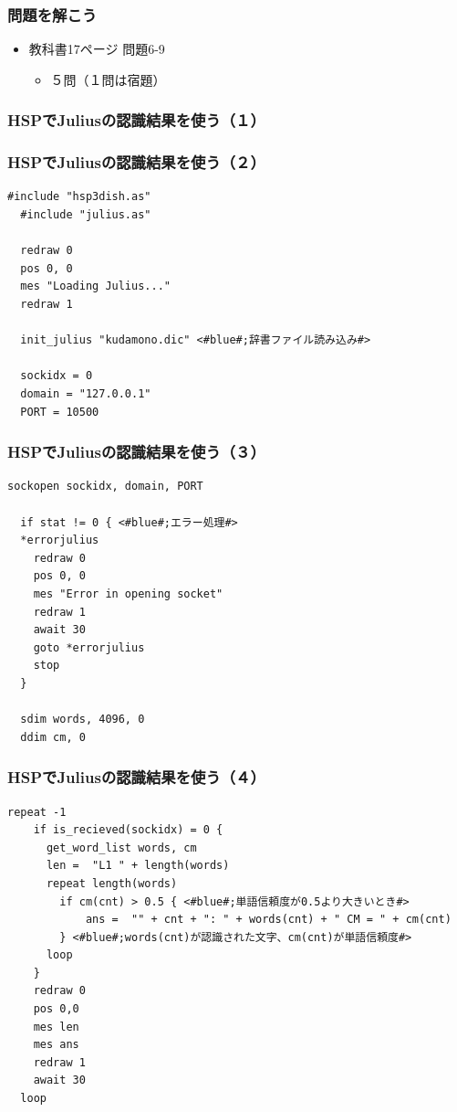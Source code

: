 \documentclass[14pt]{beamer}
\begin{document}
\begin{frame}
  \frametitle{問題を解こう}
  \begin{itemize}
    \item 教科書17ページ 問題6-9
    \begin{itemize}
      \item ５問（１問は宿題）
    \end{itemize}
  \end{itemize}
\end{frame}

\begin{frame}
  \frametitle{HSPでJuliusの認識結果を使う（１）}
  \begin{figure}
    
  \end{figure}
\end{frame}

\begin{frame}[fragile]
  \frametitle{HSPでJuliusの認識結果を使う（２）}
  \begin{lstlisting}[caption=julius.hsp,label=julius.hsp]
  #include "hsp3dish.as"
  #include "julius.as"

  redraw 0
  pos 0, 0
  mes "Loading Julius..."
  redraw 1

  init_julius "kudamono.dic" <#blue#;辞書ファイル読み込み#>

  sockidx = 0
  domain = "127.0.0.1"
  PORT = 10500
  \end{lstlisting}
\end{frame}

\begin{frame}[fragile]
  \frametitle{HSPでJuliusの認識結果を使う（３）}
  \begin{lstlisting}[caption=julius.hsp,label=julius.hsp]
  sockopen sockidx, domain, PORT

  if stat != 0 { <#blue#;エラー処理#>
  *errorjulius
    redraw 0
    pos 0, 0
    mes "Error in opening socket"
    redraw 1
    await 30
    goto *errorjulius
    stop
  }

  sdim words, 4096, 0
  ddim cm, 0
  \end{lstlisting}
\end{frame}

\begin{frame}[fragile]
  \frametitle{HSPでJuliusの認識結果を使う（４）}
  \begin{lstlisting}[caption=julius.hsp,label=julius.hsp,basicstyle=\scriptsize]
  repeat -1
    if is_recieved(sockidx) = 0 {
      get_word_list words, cm
      len =  "L1 " + length(words)
      repeat length(words)
        if cm(cnt) > 0.5 { <#blue#;単語信頼度が0.5より大きいとき#>
            ans =  "" + cnt + ": " + words(cnt) + " CM = " + cm(cnt)
        } <#blue#;words(cnt)が認識された文字、cm(cnt)が単語信頼度#>
      loop
    }
    redraw 0
    pos 0,0
    mes len
    mes ans
    redraw 1
    await 30
  loop
  \end{lstlisting}
\end{frame}
\end{document}
